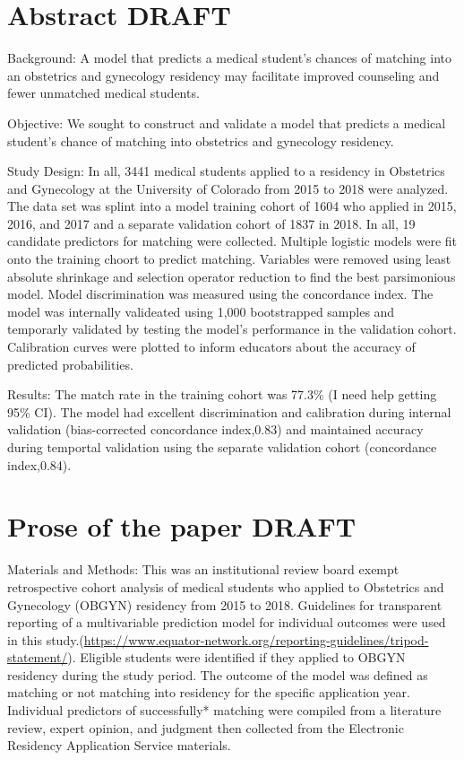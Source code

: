 \documentclass[12pt,]{article}
\begin{document}
\hypertarget{abstract-draft}{%
\section{Abstract DRAFT}\label{abstract-draft}}

Background: A model that predicts a medical student's chances of
matching into an obstetrics and gynecology residency may facilitate
improved counseling and fewer unmatched medical students.

Objective: We sought to construct and validate a model that predicts a
medical student's chance of matching into obstetrics and gynecology
residency.

Study Design: In all, 3441 medical students applied to a residency in
Obstetrics and Gynecology at the University of Colorado from 2015 to
2018 were analyzed. The data set was splint into a model training cohort
of 1604 who applied in 2015, 2016, and 2017 and a separate validation
cohort of 1837 in 2018. In all, 19 candidate predictors for matching
were collected. Multiple logistic models were fit onto the training
choort to predict matching. Variables were removed using least absolute
shrinkage and selection operator reduction to find the best parsimonious
model. Model discrimination was measured using the concordance index.
The model was internally valideated using 1,000 bootstrapped samples and
temporarly validated by testing the model's performance in the
validation cohort. Calibration curves were plotted to inform educators
about the accuracy of predicted probabilities.

Results: The match rate in the training cohort was 77.3\% (I need help
getting 95\% CI). The model had excellent discrimination and calibration
during internal validation (bias-corrected concordance index,0.83) and
maintained accuracy during temportal validation using the separate
validation cohort (concordance index,0.84).

\hypertarget{prose-of-the-paper-draft}{%
\section{Prose of the paper DRAFT}\label{prose-of-the-paper-draft}}

Materials and Methods: This was an institutional review board exempt
retrospective cohort analysis of medical students who applied to
Obstetrics and Gynecology (OBGYN) residency from 2015 to 2018.
Guidelines for transparent reporting of a multivariable prediction model
for individual outcomes were used in this
study.(\url{https://www.equator-network.org/reporting-guidelines/tripod-statement/}).
Eligible students were identified if they applied to OBGYN residency
during the study period. The outcome of the model was defined as
matching or not matching into residency for the specific application
year. Individual predictors of successfully* matching were compiled from
a literature review, expert opinion, and judgment then collected from
the Electronic Residency Application Service materials.
\end{document}
